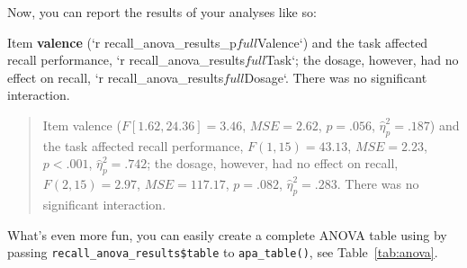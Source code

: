 \documentclass[english,man,floatsintext]{apa6}
\newenvironment{Shaded}{\begin{snugshade}}{\end{snugshade}}
\newcommand{\DataTypeTok}[1]{\textcolor[rgb]{0.13,0.29,0.53}{#1}}
\newcommand{\KeywordTok}[1]{\textcolor[rgb]{0.13,0.29,0.53}{\textbf{#1}}}
\newcommand{\NormalTok}[1]{#1}
\newcommand{\OperatorTok}[1]{\textcolor[rgb]{0.81,0.36,0.00}{\textbf{#1}}}
\newcommand{\StringTok}[1]{\textcolor[rgb]{0.31,0.60,0.02}{#1}}
\begin{document}
Now, you can report the results of your analyses like so:

\begin{Shaded}
\begin{Highlighting}[]
\NormalTok{Item }\KeywordTok{valence}\NormalTok{ (}\StringTok{`}\DataTypeTok{r recall_anova_results_p$full$Valence}\StringTok{`}\NormalTok{) and the task}
\NormalTok{affected recall performance, }\StringTok{`}\DataTypeTok{r recall_anova_results$full$Task}\StringTok{`}\NormalTok{; the dosage,}
\NormalTok{however, had no effect on recall, }\StringTok{`}\DataTypeTok{r recall_anova_results$full$Dosage}\StringTok{`}\NormalTok{.}
\NormalTok{There was no significant interaction.}
\end{Highlighting}
\end{Shaded}

\begin{quote}
Item valence (\(F[1.62, 24.36] = 3.46\), \(\mathit{MSE} = 2.62\), \(p = .056\), \(\hat{\eta}^2_p = .187\)) and the task affected recall performance, \(F(1, 15) = 43.13\), \(\mathit{MSE} = 2.23\), \(p < .001\), \(\hat{\eta}^2_p = .742\);
the dosage, however, had no effect on recall, \(F(2, 15) = 2.97\), \(\mathit{MSE} = 117.17\), \(p = .082\), \(\hat{\eta}^2_p = .283\).
There was no significant interaction.
\end{quote}

What's even more fun, you can easily create a complete ANOVA table using by passing \texttt{recall\_anova\_results\$table} to \texttt{apa\_table()}, see Table~\ref{tab:anova}.





\begin{Shaded}
\end{Shaded}
\end{document}
